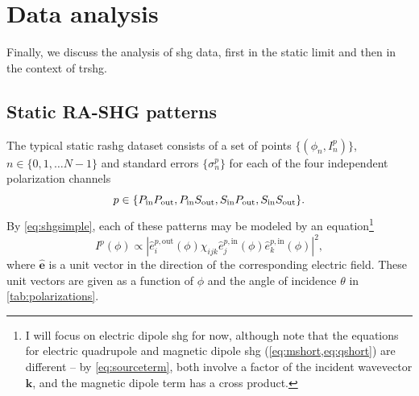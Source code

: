 \section{Data analysis}\label{sec:dataanalysis}

Finally, we discuss the analysis of \gls{shg} data, first in the static limit and then in the context of \gls{trshg}.

\subsection{Static RA-SHG patterns}\label{sec:staticanalysis}

The typical static \gls{rashg} dataset consists of a set of points $\{(\phi_n, I^p_n)\}$, $n \in \{0, 1, \ldots N-1\}$ and standard errors $\{\sigma^p_n\}$ for each of the four independent polarization channels
\[
p\in\{P_\mathrm{in}P_\mathrm{out}, P_\mathrm{in}S_\mathrm{out}, S_\mathrm{in}P_\mathrm{out}, S_\mathrm{in}S_\mathrm{out}\}.
\]
By \cref{eq:shgsimple}, each of these patterns may be modeled by an equation\footnote{I will focus on electric dipole \gls{shg} for now, although note that the equations for electric quadrupole and magnetic dipole \gls{shg} (\cref{eq:mshort,eq:qshort}) are different -- by \cref{eq:sourceterm}, both involve a factor of the incident wavevector $\bm{k}$, and the magnetic dipole term has a cross product.}
\begin{equation}\label{eq:fundamentalmodel}
I^p(\phi) \propto |\hat{e}_i^{p,\mathrm{out}}(\phi)\chi_{ijk}\hat{e}_j^{p,\mathrm{in}}(\phi)\hat{e}_k^{p,\mathrm{in}}(\phi)|^2,
\end{equation}
where $\hat{\bm{e}}$ is a unit vector in the direction of the corresponding electric field.
These unit vectors are given as a function of $\phi$ and the angle of incidence $\theta$ in \cref{tab:polarizations}.

